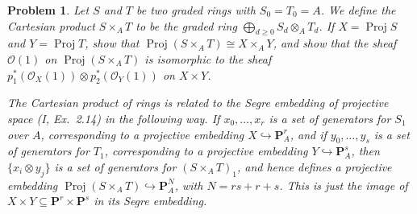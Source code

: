 \documentclass[12pt,letterpaper]{article}
\newtheorem{problem}{Problem}[section]
\theoremstyle{definition}
\theoremstyle{remark}
\numberwithin{equation}{section}
\numberwithin{figure}{problem}
\DeclareMathOperator{\Proj}{Proj}
\newcommand{\OO}{\mathcal{O}}
\begin{document}
\begin{problem}
  Let $S$ and $T$ be two graded rings with $S_0 = T_0 = A$. We define the \emph{Cartesian product} $S \times_A T$ to be the graded ring $\bigoplus_{d \ge 0} S_d \otimes_A T_d$. If $X = \Proj S$ and $Y = \Proj T$, show that $\Proj(S \times_A T) \cong X \times_A Y$, and show that the sheaf $\OO(1)$ on $\Proj(S \times_A T)$ is isomorphic to the sheaf $p_1^*(\OO_X(1)) \otimes p_2^*(\OO_Y(1))$ on $X \times Y$.
  \par The Cartesian product of rings is related to the \emph{Segre embedding} of projective space \emph{(I, Ex.~2.14)} in the following way. If $x_0,\ldots,x_r$ is a set of generators for $S_1$ over $A$, corresponding to a projective embedding $X \hookrightarrow \mathbf{P}^r_A$, and if $y_0,\ldots,y_s$ is a set of generators for $T_1$, corresponding to a projective embedding $Y \hookrightarrow \mathbf{P}_A^s$, then $\{x_i \otimes y_j\}$ is a set of generators for $(S \times_A T)_1$, and hence defines a projective embedding $\Proj(S \times_A T) \hookrightarrow \mathbf{P}^N_A$, with $N = rs + r + s$. This is just the image of $X \times Y \subseteq \mathbf{P}^r \times \mathbf{P}^s$ in its Segre embedding.
\end{problem}
\end{document}
